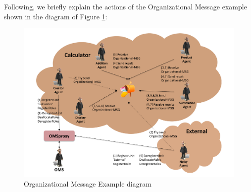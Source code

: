 Following, we briefly explain the actions of the Organizational Message example shown in the diagram of Figure
\ref{fig:OMessageDiagram}:

\begin{figure}[h!t]
	\centering
	\includegraphics[width=\textwidth]{Thomas/images/organizationalMessageExample}
	\caption{Organizational Message Example diagram}
  \label{fig:OMessageDiagram}
\end{figure}

